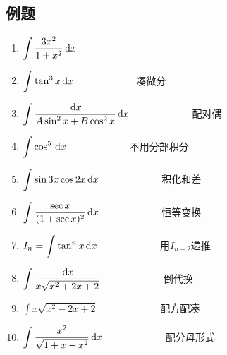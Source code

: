 \subsection{例题}
\begin{enumerate}
	\item $\displaystyle\int \frac{3x^2}{1+x^2}\,\mathrm{d} x$
	\item $\displaystyle\int \tan^3 x\,\mathrm{d} x\qquad\qquad\qquad$ 凑微分
	\item $\displaystyle\int \frac{\,\mathrm{d} x}{A\sin^2 x+B\cos^2 x}\,\mathrm{d} x\qquad\qquad\qquad$ 配对偶
	\item $\displaystyle\int \cos^5\,\mathrm{d} x\qquad\qquad\qquad$ 不用分部积分
	\item $\displaystyle\int \sin 3x \cos 2x\,\mathrm{d} x\qquad\qquad\qquad$ 积化和差
	\item $\displaystyle\int \frac{\sec x}{(1+\sec x)^2}\,\mathrm{d} x\qquad\qquad\qquad$ 恒等变换
	\item $I_n=\displaystyle\int \tan^n x\,\mathrm{d} x\qquad\qquad\qquad$ 用$I_{n-2}$递推
	\item $\displaystyle\int \frac{\,\mathrm{d} x}{x\sqrt{x^2+2x+2}}\qquad\qquad\qquad$ 倒代换
	\item $\displaystyle\int x\sqrt{x^2-2x+2}\qquad\qquad\qquad$ 配方配凑
	\item $\displaystyle\int \frac{x^2}{\sqrt{1+x-x^2}}\,\mathrm{d} x\qquad\qquad\qquad$ 配分母形式
\end{enumerate}